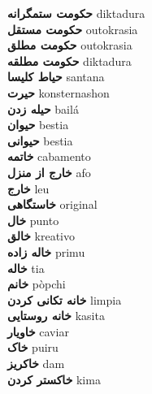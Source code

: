 \textbf{ حکومت ستمگرانه  } diktadura \\
\textbf{ حکومت مستقل  } outokrasia \\
\textbf{ حکومت مطلق  } outokrasia \\
\textbf{ حکومت مطلقه  } diktadura \\
\textbf{ حیاط کلیسا  } santana \\
\textbf{ حیرت  } konsternashon \\
\textbf{ حیله زدن  } bailá \\
\textbf{ حیوان  } bestia \\
\textbf{ حیوانی  } bestia \\
\textbf{ خاتمه  } cabamento \\
\textbf{ خارج از منزل  } afo \\
\textbf{ خارج  } leu \\
\textbf{ خاستگاهی  } original \\
\textbf{ خال  } punto \\
\textbf{ خالق  } kreativo \\
\textbf{ خاله زاده  } primu \\
\textbf{ خاله  } tia \\
\textbf{ خانم  } pòpchi \\
\textbf{ خانه تکانی کردن  } limpia \\
\textbf{ خانه روستایی  } kasita \\
\textbf{ خاویار  } caviar \\
\textbf{ خاک  } puiru \\
\textbf{ خاکریز  } dam \\
\textbf{ خاکستر کردن  } kima \\
